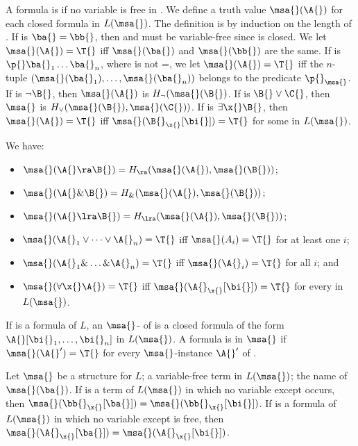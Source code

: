 A formula \A{} is  if no variable is free in \A{}.
We define a truth value $\msa{}(\A{})$ for each closed formula \A{} in $L(\msa{})$.
The definition is by induction on the length of \A{}.
If \A{} is $\ba{} = \bb{}$, then \ba{} and \bb{} must be variable-free since \A{} is closed.
We let $\msa{}(\A{}) = \T{}$ iff $\msa{}(\ba{})$ and $\msa{}(\bb{})$ are the same.
If \A{} is $\p{} \ba{}_1 \dots \ba{}_n$, where \p{} is not =, we let $\msa{}(\A{}) = \T{}$ iff the $n$-tuple $(\msa{}(\ba{}_1), \dots, \msa{} (\ba{}_n))$ belongs to the predicate $\p{}_\msa{}$.
If \A{} is $\neg \B{}$, then $\msa{}(\A{})$ is $H_\neg (\msa{}(\B{})$.
If \A{} is $\B{} \vee \C{}$, then $\msa{}$ is $H_\vee (\msa{}(\B{}), \msa{}(\C{}))$.
If \A{} is $\exists \x{} \B{}$, then $\msa{} (\A{}) = \T{}$ iff $\msa{} (\B{}_\x{} [\bi{}]) = \T{}$ for some \bi{} in $L(\msa{})$.

We have:
\begin{itemize}
    \item $\msa{} (\A{} \ra \B{}) = H_\ra (\msa{}(\A{}), \msa{}(\B{}))$;
    \item $\msa{}(\A{} \& \B{}) = H_\& (\msa{}(\A{}), \msa{}(\B{}))$;
    \item $\msa{}(\A{} \lra \B{}) = H_\lra (\msa{}(\A{}), \msa{}(\B{}))$;
    \item $\msa{}(\A{}_1 \vee \dots \vee \A{}_n) = \T{}$ iff $\msa{}(A{}_i) = \T{}$ for at least one $i$;
    \item $\msa{}(\A{}_1 \& \dots \& \A{}_n) = \T{}$ iff $\msa{}(\A{}_i) = \T{}$ for all $i$; and
    \item $\msa{}(\forall \x{} \A{}) = \T{}$ iff $\msa{} (\A{}_\x{} [\bi{}]) = \T{}$ for every \bi{} in $L(\msa{})$.
\end{itemize}

If \A{} is a formula of $L$, an $\msa{}$- of \A{} is a closed formula of the form $\A{}[\bi{}_1, \dots, \bi{}_n]$ in $L(\msa{})$.
A formula is  in $\msa{}$ if $\msa{} (\A{}') = \T{}$ for every $\msa{}$-instance $\A{}'$ of \A{}.

\begin{lemma}
    Let $\msa{}$ be a structure for $L$;
    \ba{} a variable-free term in $L(\msa{})$;
    \bi{} the name of $\msa{}(\ba{})$.
    If \bb{} is a term of $L(\msa{})$ in which no variable except \x{} occurs, then $\msa{} (\bb{}_\x{}[\ba{}]) = \msa{} (\bb{}_\x{}[\bi{}])$.
    If \A{} is a formula of $L(\msa{})$ in which no variable except \x{} is free, then $\msa{} (\A{}_\x{}[\ba{}]) = \msa{} (\A{}_\x{}[\bi{}])$.
\end{lemma}

